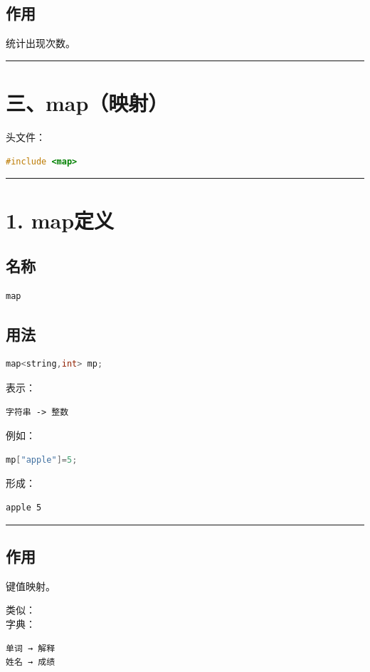 \documentclass[10pt,twocolumn]{extarticle}
\begin{document}
\subsection{作用}
统计出现次数。

\noindent\rule{\linewidth}{0.4pt}

\section{三、map（映射）}

头文件：
\begin{lstlisting}[language=C++]
#include <map>
\end{lstlisting}

\noindent\rule{\linewidth}{0.4pt}

\section{1. map定义}

\subsection{名称}
\begin{lstlisting}[language=C++]
map
\end{lstlisting}

\subsection{用法}
\begin{lstlisting}[language=C++]
map<string,int> mp;
\end{lstlisting}
表示：
\begin{lstlisting}
字符串 -> 整数
\end{lstlisting}
例如：
\begin{lstlisting}[language=C++]
mp["apple"]=5;
\end{lstlisting}
形成：
\begin{lstlisting}
apple 5
\end{lstlisting}

\noindent\rule{\linewidth}{0.4pt}

\subsection{作用}
键值映射。

类似：\\
字典：
\begin{lstlisting}
单词 → 解释
姓名 → 成绩
\end{lstlisting}
\end{document}
